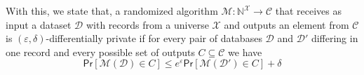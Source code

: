 \documentclass[letterpaper]{article}
\begin{document}
With this, we state that, a randomized algorithm $\mathcal{M} : \mathbb{N}^{\mathcal{X}} \to \mathcal{C}$ that receives as input a dataset $\mathcal{D}$ with records from a universe $\mathcal{X}$ and outputs an element from $\mathcal{C}$ is $(\varepsilon,\delta)$-differentially private if for every pair of databases $\mathcal{D}$ and $\mathcal{D'}$ differing in one record and every possible set of outputs $C \subseteq \mathcal{C}$ we have
\begin{equation}
\mathsf{Pr}[\mathcal{M}(\mathcal{D}) \in C] \leq e^\varepsilon \mathsf{Pr}[\mathcal{M}(\mathcal{D'}) \in C] + \delta
\end{equation}

\end{document}
